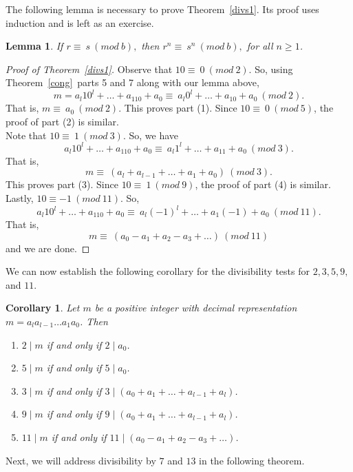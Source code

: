 \documentclass[12pt,letterpaper]{book}
\newtheorem{lemma}{Lemma}
\newtheorem{cor}{Corollary}
\begin{document}
The following lemma is necessary to prove Theorem~\ref{divs1}.  Its proof uses induction and is left as an exercise.
\begin{lemma} \label{rn}
If $r\equiv~s~(mod~b),$ then $r^n\equiv~s^n~(mod~b),$ for all $n\geq 1$. 
\end{lemma}

\begin{proof}[Proof of Theorem~\ref{divs1}] 
Observe that $10\equiv~0~(mod~2)$. So, using Theorem~\ref{cong}~parts 5 and 7 along with our lemma above, 
$$m=a_{l}10^{l}+\ldots+a_110+a_0\equiv~a_{l}0^{l}+\ldots+a_10+a_0~(mod~2).$$
That is, $m\equiv~a_0~(mod~2)$. This proves part (1). Since $10\equiv~0~(mod~5)$, the proof of part (2) is similar.\\
Note that $10\equiv~1~(mod~3)$. So, we have 
$$a_{l}10^{l}+\ldots+a_110+a_0\equiv~a_{l}1^{l}+\ldots+a_11+a_0~(mod~3).$$
That is,
$$m\equiv~(a_{l}+a_{l-1}+\ldots+a_1+a_0)~(mod~3).$$
This proves part (3).  Since $10\equiv~1~(mod~9)$, the proof of part (4) is similar.\\
Lastly, $10\equiv-1~(mod~11)$.  So, 
$$a_{l}10^{l}+\ldots+a_110+a_0\equiv~a_{l}(-1)^{l}+\ldots+a_1(-1)+a_0~(mod~11).$$
That is, 
$$m\equiv~(a_0-a_1+a_2-a_3+\ldots)~(mod~11)$$
and we are done.
\end{proof}

We can now establish the following corollary for the divisibility tests for $2,3,5,9,$ and $11$.

\begin{cor} Let $m$ be a positive integer with decimal representation\\ $m=a_{l}a_{l-1}\ldots a_1a_0$. Then
\begin{enumerate} 
\item  $2\mid m$ if and only if $2\mid a_0$.

\item  $5\mid m$ if and only if $5\mid a_0$.

\item  $3\mid m$ if and only if $3\mid (a_0+a_1+\ldots+a_{l-1}+a_{l})$.

\item  $9\mid m$ if and only if $9\mid (a_0+a_1+\ldots+a_{l-1}+a_{l})$.

\item  $11\mid m$ if and only if $11\mid (a_0-a_1+a_2-a_3+\ldots)$.
\end{enumerate}
\end{cor}

Next, we will address divisibility by $7$ and $13$ in the following theorem.
\end{document}

